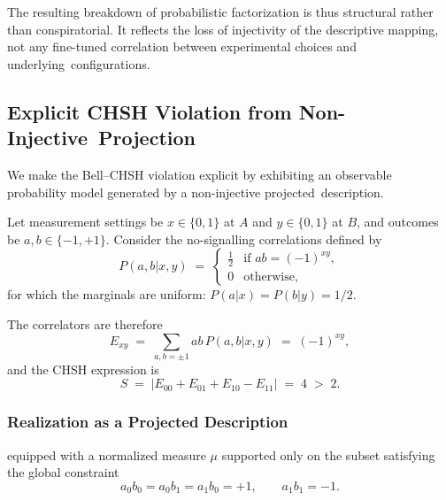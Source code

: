 \documentclass[11pt,a4paper]{article}
\theoremstyle{remark}
\begin{document}
    The resulting breakdown of probabilistic factorization is thus structural rather
    than conspiratorial.
    It reflects the loss of injectivity of the descriptive mapping, not any
    fine-tuned correlation between experimental choices and underlying~configurations.

 \subsection{Explicit CHSH Violation from Non-Injective~Projection}
    \label{subsec:explicit-chsh-violation-from-non-injective-projection}

    We make the Bell--CHSH violation explicit by exhibiting an observable probability
    model generated by a non-injective projected~description.

    Let measurement settings be $x\in\{0,1\}$ at $A$ and $y\in\{0,1\}$ at $B$,
    and outcomes be $a,b\in\{-1,+1\}$.
    Consider the no-signalling correlations defined by
\begin{equation}
      P(a,b|x,y)
      \;=\;
      \begin{cases}
        \tfrac12 & \text{if } ab = (-1)^{xy},\\
        0 & \text{otherwise,}
      \end{cases}
      \label{eq:prbox_distribution}
    \end{equation}
    for which the marginals are uniform: $P(a|x)=P(b|y)=1/2$.

    The correlators are therefore
\begin{equation}
      E_{xy} \;=\; \sum_{a,b=\pm 1} ab\,P(a,b|x,y) \;=\; (-1)^{xy},
      \label{eq:prbox_correlators}
    \end{equation}
    and the CHSH expression is
\begin{equation}
      S \;=\; \bigl|E_{00}+E_{01}+E_{10}-E_{11}\bigr|
      \;=\; 4 \;>\; 2.
      \label{eq:chsh_violation}
    \end{equation}

    \subsubsection*{Realization as a Projected Description}
     equipped with a
    normalized measure $\mu$ supported only on the subset satisfying the global
    constraint
\begin{equation}
      a_0 b_0 = a_0 b_1 = a_1 b_0 = +1, \qquad a_1 b_1 = -1.
      \label{eq:global_constraint}
    \end{equation}
\end{document}
